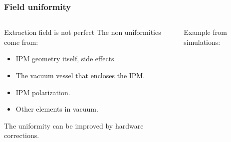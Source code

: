 \begin{frame}[t]
  \frametitle{Field uniformity}
  \begin{columns}[T]
    \begin{column}{0.45\textwidth}
      \begin{block}{Extraction field is not perfect}
        The non uniformities come from:
        \begin{itemize}
          \item IPM geometry itself, side effects.
          \item The vacuum vessel that encloses the IPM.
          \item IPM polarization.
          \item Other elements in vacuum.
        \end{itemize}
        The uniformity can be improved by hardware corrections.
      \end{block}
    \end{column}
    \begin{column}{0.45\textwidth}
      Example from simulations:
      \begin{center}
      \end{center}
    \end{column}
  \end{columns}
\end{frame}

